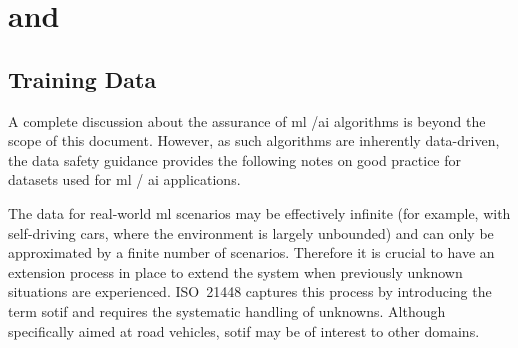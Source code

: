 %
%
\chapter{ and } \label{bkm:MachineLearning}

\section{ Training Data}
A complete discussion about the assurance of \gls{ml} /\gls{ai} algorithms is beyond the scope of this document.
However, as such algorithms are inherently data-driven, the data safety guidance provides the following notes on good practice for \glspl{dataset} used for \gls{ml} / \gls{ai} applications.

The data for real-world \gls{ml} scenarios may be effectively infinite (for example, with self-driving cars, where the environment is largely unbounded) and can only be approximated by a finite number of scenarios.
Therefore it is crucial to have an extension process in place to extend the system when previously unknown situations are experienced. 
ISO~21448 \cite{citation:ISO21448} captures this process by introducing the term \gls{sotif} and requires the systematic handling of unknowns. Although specifically aimed at road vehicles, \gls{sotif} may be of interest to other domains.

